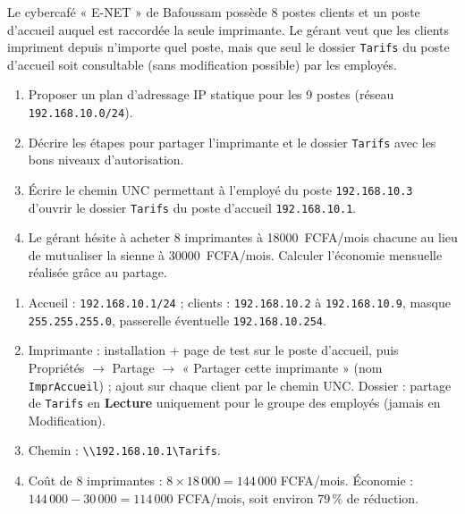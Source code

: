 \documentclass[11pt]{article}
\begin{document}
\begin{exercice}
Le cybercafé « E-NET » de Bafoussam possède 8 postes clients et un poste d'accueil auquel est raccordée la seule imprimante. Le gérant veut que les clients impriment depuis n'importe quel poste, mais que seul le dossier \texttt{Tarifs} du poste d'accueil soit consultable (sans modification possible) par les employés.
\begin{enumerate}
  \item Proposer un plan d'adressage IP statique pour les 9 postes (réseau \texttt{192.168.10.0/24}).
  \item Décrire les étapes pour partager l'imprimante et le dossier \texttt{Tarifs} avec les bons niveaux d'autorisation.
  \item Écrire le chemin UNC permettant à l'employé du poste \texttt{192.168.10.3} d'ouvrir le dossier \texttt{Tarifs} du poste d'accueil \texttt{192.168.10.1}.
  \item Le gérant hésite à acheter 8 imprimantes à \SI{18000}{FCFA}/mois chacune au lieu de mutualiser la sienne à \SI{30000}{FCFA}/mois. Calculer l'économie mensuelle réalisée grâce au partage.
\end{enumerate}
\end{exercice}

\begin{corrige}
\begin{enumerate}
  \item Accueil : \texttt{192.168.10.1/24} ; clients : \texttt{192.168.10.2} à \texttt{192.168.10.9}, masque \texttt{255.255.255.0}, passerelle éventuelle \texttt{192.168.10.254}.
  \item Imprimante : installation + page de test sur le poste d'accueil, puis Propriétés $\rightarrow$ Partage $\rightarrow$ « Partager cette imprimante » (nom \texttt{ImprAccueil}) ; ajout sur chaque client par le chemin UNC. Dossier : partage de \texttt{Tarifs} en \textbf{Lecture} uniquement pour le groupe des employés (jamais en Modification).
  \item Chemin : \texttt{\textbackslash\textbackslash 192.168.10.1\textbackslash Tarifs}.
  \item Coût de 8 imprimantes : $8 \times 18\,000 = 144\,000$ FCFA/mois. Économie : $144\,000 - 30\,000 = 114\,000$ FCFA/mois, soit environ $79\,\%$ de réduction.
\end{enumerate}
\end{corrige}
\end{document}
